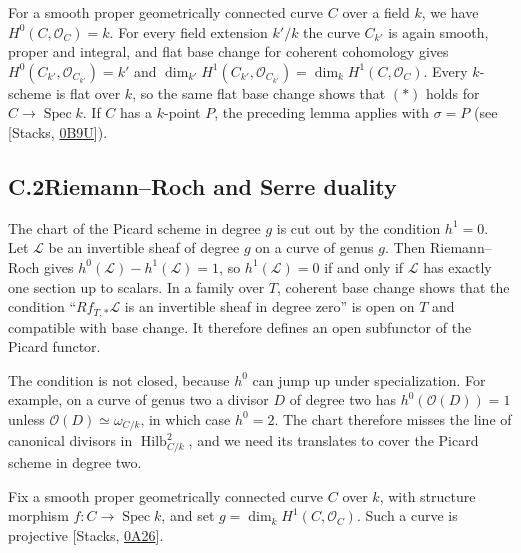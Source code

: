 \documentclass[11pt]{article}
\begin{document}
\label{bp9}%
For a smooth proper geometrically connected curve \(C\) over a field \(k\), we have \(H^0(C,\mathcal O_C)=k\). For every field extension \(k'/k\) the curve \(C_{k'}\) is again smooth, proper and integral, and flat base change for coherent cohomology gives \(H^0(C_{k'},\mathcal O_{C_{k'}})=k'\) and \(\dim_{k'}H^1(C_{k'},\mathcal O_{C_{k'}})=\dim_kH^1(C,\mathcal O_C)\). Every \(k\)-scheme is flat over \(k\), so the same flat base change shows that \((\ast)\) holds for \(C\to\operatorname{Spec}k\). If \(C\) has a \(k\)-point \(P\), the preceding lemma applies with \(\sigma=P\) (see [Stacks, \href{https://stacks.math.columbia.edu/tag/0B9U}{0B9U}]).


\subsection*{\texorpdfstring{C.2\quad Riemann–Roch and Serre duality}{C.2 Riemann–Roch and Serre duality}}
\label{bp10}%
\label{bp11}%
The chart of the Picard scheme in degree \(g\) is cut out by the condition \(h^1=0\). Let \(\mathcal L\) be an invertible sheaf of degree \(g\) on a curve of genus \(g\). Then Riemann–Roch gives \(h^0(\mathcal L)-h^1(\mathcal L)=1\), so \(h^1(\mathcal L)=0\) if and only if \(\mathcal L\) has exactly one section up to scalars. In a family over \(T\), coherent base change shows that the condition “\(Rf_{T,*}\mathcal L\) is an invertible sheaf in degree zero” is open on \(T\) and compatible with base change. It therefore defines an open subfunctor of the Picard functor.

The condition is not closed, because \(h^0\) can jump up under specialization. For example, on a curve of genus two a divisor \(D\) of degree two has \(h^0(\mathcal O(D))=1\) unless \(\mathcal O(D)\simeq\omega_{C/k}\), in which case \(h^0=2\). The chart therefore misses the line of canonical divisors in \(\operatorname{Hilb}^{2}_{C/k}\), and we need its translates to cover the Picard scheme in degree two.

Fix a smooth proper geometrically connected curve \(C\) over \(k\), with structure morphism \(f:C\to\operatorname{Spec}k\), and set \(g=\dim_kH^1(C,\mathcal O_C)\). Such a curve is projective [Stacks, \href{https://stacks.math.columbia.edu/tag/0A26}{0A26}].
\end{document}
